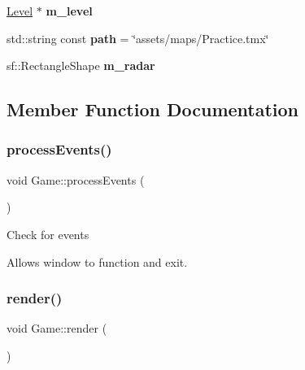 \begin{DoxyCompactItemize}
\item 
\mbox{\label{class_game_af1c31b114bdac892e4e7f723d661ad03}} 
\mbox{\hyperlink{class_level}{Level}} $\ast$ {\bfseries m\+\_\+level}
\item 
\mbox{\label{class_game_a3c9b0c30c64b794e8df746f7f64baaea}} 
std\+::string const {\bfseries path} = \char`\"{}assets/maps/Practice.\+tmx\char`\"{}
\item 
\mbox{\label{class_game_a96d52913282699c05809b06863f1166b}} 
sf\+::\+Rectangle\+Shape {\bfseries m\+\_\+radar}
\end{DoxyCompactItemize}


\subsection{Member Function Documentation}
\mbox{\label{class_game_a79f698dda206dd7a9bed28b3f88bdc38}} 
\subsubsection{\texorpdfstring{processEvents()}{processEvents()}}
{\footnotesize\ttfamily void Game\+::process\+Events (\begin{DoxyParamCaption}{ }\end{DoxyParamCaption})\hspace{0.3cm}{\ttfamily [private]}}





Check for events

Allows window to function and exit. \mbox{\label{class_game_a15ddd769261d923827a3cdf41499c843}} 
\subsubsection{\texorpdfstring{render()}{render()}}
{\footnotesize\ttfamily void Game\+::render (\begin{DoxyParamCaption}{ }\end{DoxyParamCaption})\hspace{0.3cm}{\ttfamily [private]}}





